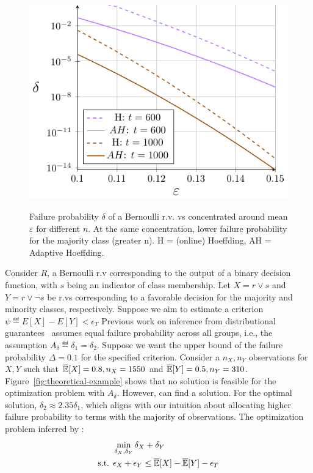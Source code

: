 \begin{figure}
    \centering
    \includegraphics[width=0.75\linewidth,alt={$\epsilon-\delta$ comparison of Hoeffding and Adaptive Hoeffding inequalities at different numbers of samples. Adaptive Hoeffding provides tighter guarantees. }]{avoir/images/bernoulli-n-comparison-pgf-tikz}
%        
    \caption{Failure probability $\delta$ of a Bernoulli r.v. vs concentrated around mean $\varepsilon$ for different $n$. At the same concentration, lower failure probability for the majority class (greater n).  H = (online) Hoeffding, AH = Adaptive Hoeffding.}
    \label{fig:n-comparison-hoeffding}
\end{figure}

Consider $R$, a Bernoulli r.v corresponding to the output of a binary decision function, with $s$ being an indicator of class membership. 
Let $X = r \vee s$ and $Y = r \vee \neg s$ be r.vs corresponding to a favorable decision for the majority and minority classes, respectively. 
Suppose we aim to estimate a criterion $\psi \eqdef E[X] - E[Y] < \epsilon_T$
Previous work on inference from distributional guarantees~\cite{albarghouthi2019fairness,bastani2019probabilistic} assumes equal failure probability across all groups, i.e., the assumption $A_\delta \eqdef \delta_1 = \delta_2$.
Suppose we want the upper bound of the failure probability $\Delta = 0.1$ for the specified criterion.
Consider a $n_X, n_Y$ observations for $X, Y$ such that $\overline{\mathbb{E}}[X] = 0.8, n_X = 1550$ and $\overline{\mathbb{E}}[Y] = 0.5, n_Y = 310$.
Figure~\ref{fig:theoretical-example} shows that no solution is feasible for the optimization problem with $A_\delta$.
However, \AVOIRmethodname{} can find a solution.
For the optimal solution, $\delta_2 \approx 2.35\delta_1$, which aligns with our intuition about allocating higher failure probability to terms with the majority of observations. 
The optimization problem inferred by \AVOIRmethodname{}:
\begin{align*}
    \begin{split}
        &\min\limits_{\delta_X, \delta_Y}{\delta_X + \delta_Y} \\
        \text{s.t.  } &\epsilon_X + \epsilon_Y \leq \overline{\mathbb{E}}[X] - \overline{\mathbb{E}}[Y] - \epsilon_T \\
    \end{split}
\end{align*}

